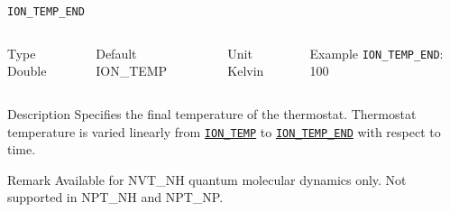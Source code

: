 \begin{frame}[allowframebreaks]{\texttt{ION\_TEMP\_END}} \label{ION_TEMP_END}
\vspace*{-12pt}
\begin{columns}
\begin{block}{Type}
Double
\end{block}

\begin{block}{Default}
ION\_TEMP
\end{block}

\begin{block}{Unit}
Kelvin
\end{block}

\begin{block}{Example}
\texttt{ION\_TEMP\_END}: 100
\end{block}
\end{columns}

\begin{block}{Description}
Specifies the final temperature of the thermostat. Thermostat temperature is varied linearly from \hyperlink{ION_TEMP}{\texttt{ION\_TEMP}} to \hyperlink{ION_TEMP_END}{\texttt{ION\_TEMP\_END}} with respect to time.
\end{block}

\begin{block}{Remark}
Available for NVT\_NH quantum molecular dynamics only. Not supported in NPT\_NH and NPT\_NP.
\end{block}

\end{frame}




